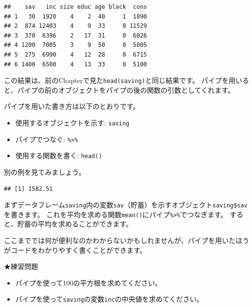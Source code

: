 \documentclass[
]{book}
\newenvironment{Shaded}{\begin{snugshade}}{\end{snugshade}}
\newcommand{\FunctionTok}[1]{\textcolor[rgb]{0.00,0.00,0.00}{#1}}
\newcommand{\NormalTok}[1]{#1}
\newcommand{\SpecialCharTok}[1]{\textcolor[rgb]{0.00,0.00,0.00}{#1}}
\providecommand{\tightlist}{%
  \setlength{\itemsep}{0pt}\setlength{\parskip}{0pt}}
\begin{document}
\begin{verbatim}
##    sav   inc size educ age black  cons
## 1   30  1920    4    2  40     1  1890
## 2  874 12403    4    9  33     0 11529
## 3  370  6396    2   17  31     0  6026
## 4 1200  7005    3    9  50     0  5805
## 5  275  6990    4   12  28     0  6715
## 6 1400  6500    4   13  33     0  5100
\end{verbatim}

この結果は、前のChapterで見た\texttt{head(saving)}と同じ結果です。
パイプを用いると、パイプの前のオブジェクトをパイプの後の関数の引数としてくれます。

パイプを用いた書き方は以下のとおりです。

\begin{itemize}
\tightlist
\item
  使用するオブジェクトを示す: \texttt{saving}
\item
  パイプでつなぐ: \texttt{\%\textgreater{}\%}
\item
  使用する関数を書く: \texttt{head()}
\end{itemize}

別の例を見てみましょう。

\begin{Shaded}
\end{Shaded}

\begin{verbatim}
## [1] 1582.51
\end{verbatim}

まずデータフレーム\texttt{saving}内の変数\texttt{sav}（貯蓄）を示すオブジェクト\texttt{saving\$sav}を書きます。
これを平均を求める関数\texttt{mean()}にパイプ\texttt{\%\textgreater{}\%}でつなぎます。
すると、貯蓄の平均を求めることができます。

ここまででは何が便利なのかわからないかもしれませんが、パイプを用いたほうがコードをわかりやすく書くことができます。

★練習問題

\begin{itemize}
\tightlist
\item
  パイプを使って100の平方根を求めてください。
\item
  パイプを使って\texttt{saving}の変数\texttt{inc}の中央値を求めてください。
\end{itemize}
\end{document}
